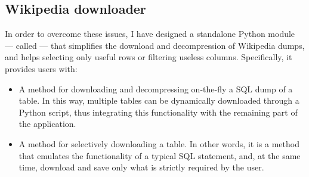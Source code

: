         \subsection{Wikipedia downloader}\label{wikipediadownloader}
            In order to overcome these issues, I have designed a standalone Python module --- called  --- that simplifies the download and decompression of Wikipedia dumps, and helps selecting only useful rows or filtering useless columns. Specifically, it provides users with:
            \begin{itemize}
                \item A method for downloading and decompressing on-the-fly a SQL dump of a table. In this way, multiple tables can be dynamically downloaded through a Python script, thus integrating this functionality with the remaining part of the application.
                \item A method for selectively downloading a table. In other words, it is a method that emulates the functionality of a typical  SQL statement, and, at the same time, download and save only what is strictly required by the user.
            \end{itemize}
            
